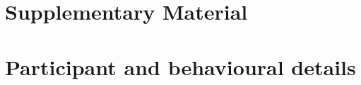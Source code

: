 \documentclass[utf8]{frontiers_suppmat}
\begin{document}
\raggedbottom
\onecolumn
{}
\fi

\ifdefined\SUPPLEMENTARYINCLUDED
\section*{Supplementary Material}
\setcounter{section}{0}
\renewcommand{\thesection}{S\arabic{section}}
\else
\title[Supplementary Material]{{}}
\maketitle
\fi

\setcounter{figure}{0}
\setcounter{table}{0}
\renewcommand{\thefigure}{S\arabic{figure}}
\renewcommand{\thetable}{S\arabic{table}}
\providecommand{\networkrowlabel}[1]{%
    \par\noindent\makebox[\linewidth][l]{\textbf{#1}}\par\vspace{0.08em}%
}
\providecommand{\networkrowpanel}[2]{%
    \par\noindent\makebox[\linewidth][l]{\textbf{#1}\quad\textbf{#2}}\par\vspace{0.08em}%
}

\section{Participant and behavioural details}
\end{document}
